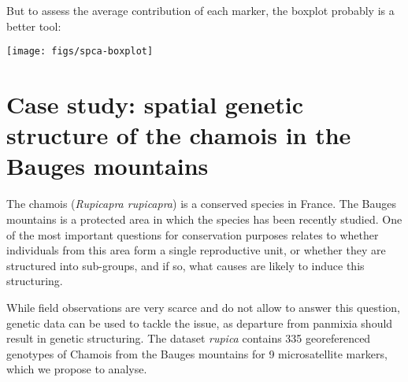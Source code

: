 \documentclass{article}
\begin{document}
But to assess the average contribution of each marker, the
boxplot probably is a better tool:
\begin{Schunk}
\end{Schunk}
\texttt{[image: figs/spca-boxplot]}











\section{Case study: spatial genetic structure of the chamois in the Bauges mountains}
The chamois (\textit{Rupicapra rupicapra}) is a conserved species in France.
The Bauges mountains is a protected area in which the species has been
recently studied.
One of the most important questions for conservation purposes relates to whether individuals
from this area form a single reproductive unit, or whether they
are structured into sub-groups, and if so, what causes are likely to
induce this structuring.

While field observations are very scarce and do not allow to answer
this question, genetic data can be used to tackle the issue, as
departure from panmixia should result in genetic structuring.
The dataset \textit{rupica} contains 335 georeferenced genotypes of Chamois from the
Bauges mountains for 9 microsatellite markers, which we propose to
analyse.



\end{document}
